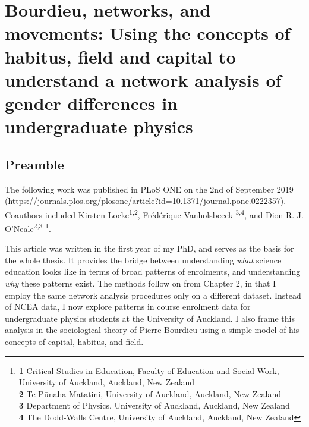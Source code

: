 \chapter[Bourdieu, Networks, and Movements][]{Bourdieu, networks, and movements: Using the concepts of habitus, field and capital to understand a network analysis of gender differences in undergraduate physics}

\section{Preamble}
The following work was published in PLoS ONE on the 2nd of September 2019 (https://journals.plos.org/plosone/article?id=10.1371/journal.pone.0222357). Coauthors included Kirsten Locke\textsuperscript{1,2}, Fr\'ed\'erique Vanholsbeeck \textsuperscript{3,4}, and 
Dion R. J. O'Neale\textsuperscript{2,3}
\footnote{\textbf{1} Critical Studies in Education, Faculty of Education and Social Work, University of Auckland, Auckland, New Zealand
\\
\textbf{2} Te P\={u}naha Matatini, University of Auckland, Auckland, New Zealand
\\
\textbf{3} Department of Physics, University of Auckland, Auckland, New Zealand
\\
\textbf{4} The Dodd-Walls Centre, University of Auckland, Auckland, New Zealand}. 

This article was written in the first year of my PhD, and serves as the basis for the whole thesis. It provides the bridge between understanding \textit{what} science education looks like in terms of broad patterns of enrolments, and understanding \textit{why} these patterns exist. The methods follow on from Chapter 2, in that I employ the same network analysis procedures only on a different dataset. Instead of NCEA data, I now explore patterns in course enrolment data for undergraduate physics students at the University of Auckland. I also frame this analysis in the sociological theory of Pierre Bourdieu using a simple model of his concepts of capital, habitus, and field. 

